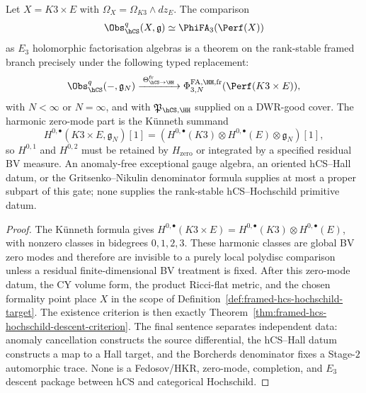 \begin{corollary}
\label{cor:k3e-stage1-hcs-hochschild-gate}
Let $X=K3\times E$ with $\Omega_X=\Omega_{K3}\wedge dz_E$. The
comparison
\[
 \Obs_{\hCS}^{q}(X,\mathfrak g)
 \simeq
 \PhiFA_3(\Perf(X))
\]
as $E_3$ holomorphic factorisation algebras is a theorem on the
rank-stable framed branch precisely under the following typed
replacement:
\[
 \Obs_{\hCS}^{q}(-,\mathfrak g_N)
 \xrightarrow{\;\Theta_{\hCS\to\HH}^{\mathrm{fr}}\;}
 \Phi^{\mathrm{FA},\HH,\mathrm{fr}}_{3,N}(\Perf(K3\times E)),
\]
with $N<\infty$ or $N=\infty$, and with
$\mathfrak P_{\hCS,\HH}$ supplied on a DWR-good cover. The harmonic
zero-mode part is the K\"unneth summand
\[
 H^{0,\bullet}(K3\times E,\mathfrak g_N)[1]
 =
 (H^{0,\bullet}(K3)\otimes H^{0,\bullet}(E)\otimes\mathfrak g_N)[1],
\]
so $H^{0,1}$ and $H^{0,2}$ must be retained by
$H_{\mathrm{zero}}$ or integrated by a specified residual BV measure.
An anomaly-free exceptional gauge algebra, an oriented hCS--Hall datum,
or the Gritsenko--Nikulin denominator formula supplies at most a proper
subpart of this gate; none supplies the rank-stable
hCS--Hochschild primitive datum.
\end{corollary}

\begin{proof}
The K\"unneth formula gives
$H^{0,\bullet}(K3\times E)=H^{0,\bullet}(K3)\otimes H^{0,\bullet}(E)$,
with nonzero classes in bidegrees $0,1,2,3$. These harmonic classes are
global BV zero modes and therefore are invisible to a purely local
polydisc comparison unless a residual finite-dimensional BV treatment
is fixed. After this zero-mode datum, the CY volume form, the product
Ricci-flat metric, and the chosen formality point place $X$ in the
scope of Definition~\ref{def:framed-hcs-hochschild-target}. The
existence criterion is then exactly
Theorem~\ref{thm:framed-hcs-hochschild-descent-criterion}. The final
sentence separates independent data: anomaly cancellation constructs
the source differential, the hCS--Hall datum constructs a map to a Hall
target, and the Borcherds denominator fixes a Stage-$2$ automorphic
trace. None is a Fedosov/HKR, zero-mode, completion, and $E_3$ descent
package between hCS and categorical Hochschild.
\end{proof}

